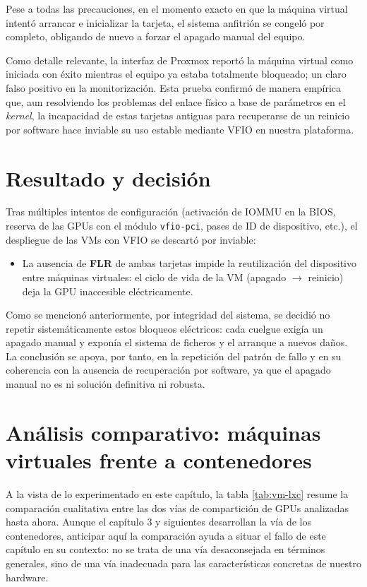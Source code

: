 Pese a todas las precauciones, en el momento exacto en que la máquina virtual intentó arrancar e 
inicializar la tarjeta, el sistema anfitrión se congeló por completo, obligando de nuevo a forzar el 
apagado manual del equipo. 

Como detalle relevante, la interfaz de Proxmox reportó la máquina virtual como iniciada con éxito
mientras el equipo ya estaba totalmente bloqueado; un claro falso positivo en la monitorización. 
Esta prueba confirmó de manera empírica que, aun resolviendo los problemas del enlace físico a base de 
parámetros en el \textit{kernel}, la incapacidad de estas tarjetas antiguas para recuperarse de un reinicio por 
software hace inviable su uso estable mediante VFIO en nuestra plataforma.

\section{Resultado y decisión}

Tras múltiples intentos de configuración (activación de IOMMU en la BIOS, reserva de las GPUs con el módulo \texttt{vfio-pci}, pases de ID de dispositivo, etc.), el despliegue de las VMs con VFIO se descartó por inviable:

\begin{itemize}
    \item La ausencia de \textbf{FLR} de ambas tarjetas impide la reutilización del dispositivo
entre máquinas virtuales: el ciclo de vida de la VM (apagado $\rightarrow$ reinicio) deja la GPU
inaccesible eléctricamente.
\end{itemize}

Como se mencionó anteriormente, por integridad del sistema, 
se decidió no repetir sistemáticamente estos bloqueos eléctricos: cada cuelgue exigía un apagado manual y 
exponía el sistema de ficheros y el arranque a nuevos daños. La conclusión se apoya, por tanto, en la repetición 
del patrón de fallo y en su coherencia con la ausencia de recuperación por software, ya que el apagado manual
no es ni solución definitiva ni robusta.

\section{Análisis comparativo: máquinas virtuales frente a contenedores}

A la vista de lo experimentado en este capítulo, la tabla \ref{tab:vm-lxc} resume la comparación 
cualitativa entre las dos vías de compartición de GPUs analizadas hasta ahora. Aunque el capítulo 3 y 
siguientes desarrollan la vía de los contenedores, anticipar aquí la comparación ayuda a situar el fallo 
de este capítulo en su contexto: no se trata de una vía desaconsejada en términos generales, sino de una vía inadecuada para 
las características concretas de nuestro hardware.

